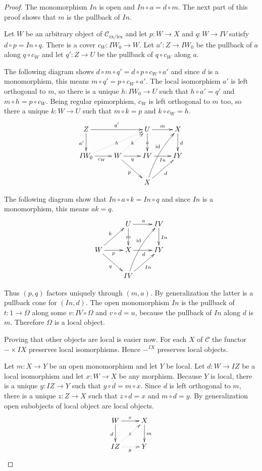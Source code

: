 \documentclass[sort&compress]{elsarticle}
\theoremstyle{plain}
\theoremstyle{definition}
\theoremstyle{remark}
\newcommand\cat\mathcal
\newcommand\exlex{_\mathrm{ex/lex}}
\begin{document}
\begin{proof}
The monomorphism $In$ is open and $In \circ a = d\circ m$. The next part of this proof shows that $m$ is the pullback of $In$.

Let $W$ be an arbitrary object of $\cat C\exlex$ and let $p: W\to X$ and $q:W\to IV$ satisfy $d\circ p = In\circ q$. There is a cover $c_W:IW_0 \to W$. Let $a':Z\to IW_0$ be the pullback of $a$ along $q\circ c_W$ and let $q':Z\to U$ be the pullback of $q\circ c_W$ along $a$.

The following diagram shows $d\circ m \circ q' = d\circ p \circ c_W \circ a'$ and since $d$ is a monomorphism, this means $m\circ q' = p \circ c_W \circ a'$. The local isomorphism $a'$ is left orthogonal to $m$, so there is a unique $h:IW_0 \to U$ such that $h\circ a'= q'$ and $m\circ h = p\circ c_W$. Being regular epimorphism, $c_W$ is left orthogonal to $m$ too, so there a unique $k: W\to U$ such that $m\circ k = p$ and $k\circ c_W = h$.
\[ \xymatrix{
Z \ar[rr]^{q'} \ar[d]_{a'} && U \ar[r]^m \ar[d]|a & X\ar[d]^d \\
IW_0 \ar[r]_{c_W}\ar@{.>}[urr]|h & W \ar[r]_q \ar[dr]_{p}\ar@{.>}[ur]|k & IV\ar[r]_{In} & IY \\ 
& & X \ar[ur]_d \ar@/^/[uur]^(.6)\id
}\]

The following diagram show that $In\circ a\circ k = In\circ q$ and since $In$ is a monomorphism, this means $a k = q$.
\[ \xymatrix{
& U \ar[d]|m \ar[r]^a & IV \ar[d]^{In} \\  
W \ar[ur]^k \ar[r]_p \ar[dr]_q & X\ar[r]_d & IY \\
& IV \ar[ur]_{In} \ar@/^/[uur]^(.6)\id
}\]

Thus $(p,q)$ factors uniquely through $(m,a)$. By generalization the latter is a pullback cone for $(In, d)$. The open monomorphism $In$ is the pullback of $t:1\to \Omega$ along some $v:IV\circ \Omega$ and $v\circ d = u$, because the pullback of $In$ along $d$ is $m$. Therefore $\Omega$ is a local object.

Proving that other objects are local is easier now. For each $X$ of $\cat C$ the functor $-\times IX$ preserves local isomorphisms. Hence $-^{IX}$ preserves local objects.

Let $m:X\to Y$ be an open monomorphism and let $Y$ be local. Let $d: W\to IZ$ be a local isomorphism and let $x:W\to X$ be any morphism. Because $Y$ is local, there is a unique $y: IZ\to Y$ such that $y\circ d = m\circ x$. Since $d$ is left orthogonal to $m$, there is a unique $z:Z\to X$ such that $z\circ d = x$ and $m\circ d = y$. By generalization open subobjects of local object are local objects.
\[ \xymatrix{
W\ar[d]_d \ar[r]^x & X\ar[d]^m \\
IZ \ar@{.>}[r]_{y} \ar@{.>}[ur]|z & Y
}\]


\end{proof}
\end{document}
